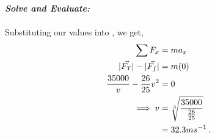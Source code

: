 \begin{subquestions}
\begin{subsubquestions}
\textbf{\textit{Solve and Evaluate:}} \\ \\
Substituting our values into , we get,
\begin{align}
	\sum F_x & = ma_x \nonumber \\
	|\vec{F_T}|-|\vec{F_f}| & = m(0) \nonumber \\
	\frac{35000}{v} - \frac{26}{25}v^2 & = 0 \nonumber \\
	\implies v & = \sqrt[3]{\frac{35000}{\frac{26}{25}}} \nonumber \\
	           & = 32.3 ms^{-1} \,.
\end{align}

\end{subsubquestions}
	
\end{subquestions}










